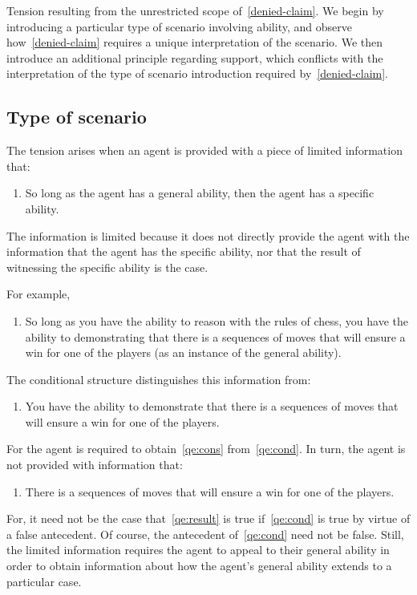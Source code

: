 \documentclass[10pt]{article}
\begin{document}
\begin{note}[Overview]
  Tension resulting from the unrestricted scope of~\ref{denied-claim}.
  We begin by introducing a particular type of scenario involving ability, and observe how~\ref{denied-claim} requires a unique interpretation of the scenario.
  We then introduce an additional principle regarding support, which conflicts with the interpretation of the type of scenario introduction required by~\ref{denied-claim}.
\end{note}

\subsection{Type of scenario}
\label{sec:type-scenario}

\begin{note}
  The tension arises when an agent is provided with a piece of limited information that:
  \begin{enumerate}[label=(I\arabic*), ref=(I\arabic*)]
  \item So long as the agent has a general ability, then the agent has a specific ability.
  \end{enumerate}
  The information is limited because it does not directly provide the agent with the information that the agent has the specific ability, nor that the result of witnessing the specific ability is the case.

  For example,
  \begin{enumerate}[label=(I\arabic*), ref=(I\arabic*), resume]
  \item\label{qe:cond} So long as you have the ability to reason with the rules of chess, you have the ability to demonstrating that there is a sequences of moves that will ensure a win for one of the players (as an instance of the general ability).
  \end{enumerate}
  The conditional structure distinguishes this information from:
  \begin{enumerate}[label=(I\arabic*), ref=(I\arabic*), resume]
  \item\label{qe:cons} You have the ability to demonstrate that there is a sequences of moves that will ensure a win for one of the players.
  \end{enumerate}
  For the agent is required to obtain~\ref{qe:cons} from~\ref{qe:cond}.
  In turn, the agent is not provided with information that:
  \begin{enumerate}[label=(I\arabic*), ref=(I\arabic*), resume]
  \item\label{qe:result} There is a sequences of moves that will ensure a win for one of the players.
  \end{enumerate}
  For, it need not be the case that~\ref{qe:result} is true if~\ref{qe:cond} is true by virtue of a false antecedent.
  Of course, the antecedent of~\ref{qe:cond} need not be false.
  Still, the limited information requires the agent to appeal to their general ability in order to obtain information about how the agent's general ability extends to a particular case.


\end{note}
\end{document}
